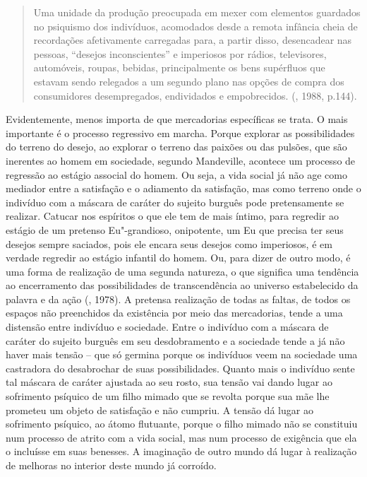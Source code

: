 \begin{quote}
Uma unidade da produção preocupada em mexer com elementos guardados no
psiquismo dos indivíduos, acomodados desde a remota infância cheia de
recordações afetivamente carregadas para, a partir disso, desencadear
nas pessoas, ``desejos inconscientes'' e imperiosos por rádios,
televisores, automóveis, roupas, bebidas, principalmente os bens
supérfluos que estavam sendo relegados a um segundo plano nas opções de
compra dos consumidores desempregados, endividados e empobrecidos.
(, 1988, p.144).
\end{quote}

Evidentemente, menos importa de que mercadorias específicas se trata. O
mais importante é o processo regressivo em marcha. Porque explorar as
possibilidades do terreno do desejo, ao explorar o terreno das paixões
ou das pulsões, que são inerentes ao homem em sociedade, segundo
Mandeville, acontece um processo de regressão ao estágio associal do
homem. Ou seja, a vida social já não age como mediador entre a
satisfação e o adiamento da satisfação, mas como terreno onde o
indivíduo com a máscara de caráter do sujeito burguês pode pretensamente
se realizar. Catucar nos espíritos o que ele tem de mais íntimo, para
regredir ao estágio de um pretenso Eu"-grandioso, onipotente, um Eu que
precisa ter seus desejos sempre saciados, pois ele encara seus desejos
como imperiosos, é em verdade regredir ao estágio infantil do homem. Ou,
para dizer de outro modo, é uma forma de realização de uma segunda
natureza, o que significa uma tendência ao encerramento das
possibilidades de transcendência ao universo estabelecido da palavra e
da ação (, 1978). A pretensa realização de todas as faltas, de
todos os espaços não preenchidos da existência por meio das mercadorias,
tende a uma distensão entre indivíduo e sociedade. Entre o indivíduo com
a máscara de caráter do sujeito burguês em seu desdobramento e a
sociedade tende a já não haver mais tensão -- que só germina porque os
indivíduos veem na sociedade uma castradora do desabrochar de suas
possibilidades. Quanto mais o indivíduo sente tal máscara de caráter
ajustada ao seu rosto, sua tensão vai dando lugar ao sofrimento psíquico
de um filho mimado que se revolta porque sua mãe lhe prometeu um objeto
de satisfação e não cumpriu. A tensão dá lugar ao sofrimento psíquico,
ao átomo flutuante, porque o filho mimado não se constituiu num processo
de atrito com a vida social, mas num processo de exigência que ela o
incluísse em suas benesses. A imaginação de outro mundo dá lugar à
realização de melhoras no interior deste mundo já corroído.

